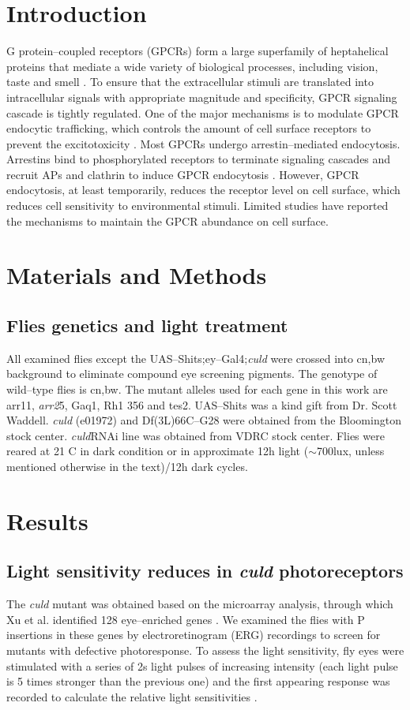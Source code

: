 \section{Introduction}
G protein--coupled receptors (GPCRs) form a large superfamily of heptahelical proteins that mediate a wide variety of biological processes, including vision, taste and smell \cite{Ferguson2001,Claing2002,Shenoy2003}. To ensure that the extracellular stimuli are translated into intracellular signals with appropriate magnitude and specificity, GPCR signaling cascade is tightly regulated. One of the major mechanisms is to modulate GPCR endocytic trafficking, which controls the amount of cell surface receptors to prevent the excitotoxicity \cite{Claing2002}. Most GPCRs undergo arrestin--mediated endocytosis. Arrestins bind to phosphorylated receptors to terminate signaling cascades and recruit APs and clathrin to induce GPCR endocytosis \cite{Claing2002,Shenoy2003,Pfleger2007}. However, GPCR endocytosis, at least temporarily, reduces the receptor level on cell surface, which reduces cell sensitivity to environmental stimuli. Limited studies have reported the mechanisms to maintain the GPCR abundance on cell surface. 

\section{Materials and Methods}
\subsection{Flies genetics and light treatment}
All examined flies except the UAS--Shits;ey--Gal4;\textit{culd} were crossed into cn,bw background to eliminate compound eye screening pigments. The genotype of wild--type flies is cn,bw. The mutant alleles used for each gene in this work are arr11, \textit{arr2}5, Gaq1, Rh1 356 and tes2. UAS--Shits was a kind gift from Dr. Scott Waddell. \textit{culd} (e01972) and Df(3L)66C--G28 were obtained from the Bloomington stock center. \textit{culd}RNAi line was obtained from VDRC stock center. Flies were reared at 21 C in dark condition or in approximate 12h light ($\sim$700lux, unless mentioned otherwise in the text)/12h dark cycles. 

\section{Results}
\subsection{Light sensitivity reduces in \textit{culd} photoreceptors}
The \textit{culd} mutant was obtained based on the microarray analysis, through which Xu et al. identified 128 eye--enriched genes \cite{Xu2004}. We examined the flies with P insertions in these genes by electroretinogram (ERG) recordings to screen for mutants with defective photoresponse. To assess the light sensitivity, fly eyes were stimulated with a series of 2s light pulses of increasing intensity (each light pulse is 5 times stronger than the previous one) and the first appearing response was recorded to calculate the relative light sensitivities \cite{Han2007}. 
 
